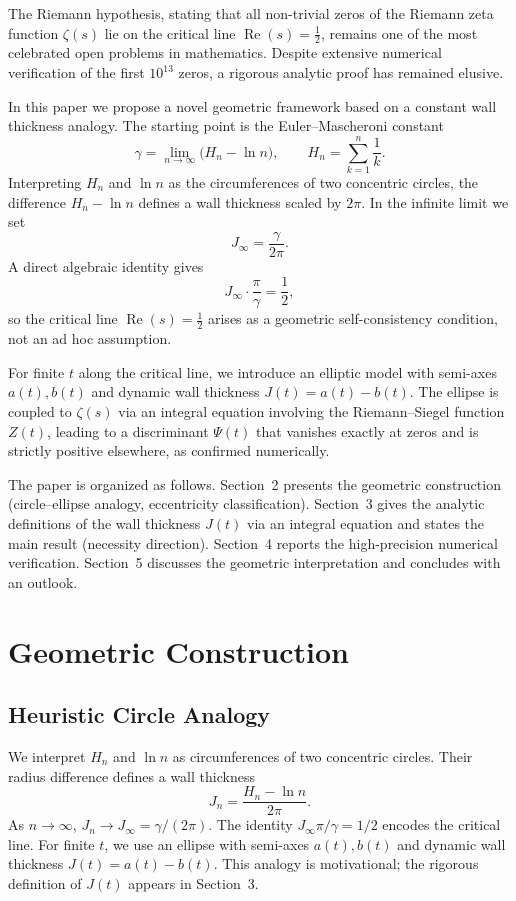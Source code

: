 \documentclass[12pt,a4paper]{article}
\begin{document}
The Riemann hypothesis, stating that all non-trivial zeros of the Riemann zeta function \(\zeta(s)\) lie on the critical line \(\operatorname{Re}(s)=\frac12\), remains one of the most celebrated open problems in mathematics. Despite extensive numerical verification of the first \(10^{13}\) zeros, a rigorous analytic proof has remained elusive.

In this paper we propose a novel geometric framework based on a constant wall thickness analogy. The starting point is the Euler--Mascheroni constant
\[
\gamma = \lim_{n\to\infty}\bigl(H_n - \ln n\bigr),\qquad H_n = \sum_{k=1}^{n}\frac1k.
\]
Interpreting \(H_n\) and \(\ln n\) as the circumferences of two concentric circles, the difference \(H_n-\ln n\) defines a wall thickness scaled by \(2\pi\). In the infinite limit we set
\[
J_{\infty} = \frac{\gamma}{2\pi}.
\]
A direct algebraic identity gives
\[
J_{\infty}\cdot\frac{\pi}{\gamma} = \frac12,
\]
so the critical line \(\operatorname{Re}(s)=\frac12\) arises as a geometric self-consistency condition, not an ad hoc assumption.

For finite \(t\) along the critical line, we introduce an elliptic model with semi-axes \(a(t),b(t)\) and dynamic wall thickness \(J(t)=a(t)-b(t)\). The ellipse is coupled to \(\zeta(s)\) via an integral equation involving the Riemann--Siegel function \(Z(t)\), leading to a discriminant \(\Psi(t)\) that vanishes exactly at zeros and is strictly positive elsewhere, as confirmed numerically.

The paper is organized as follows. Section~2 presents the geometric construction (circle--ellipse analogy, eccentricity classification). Section~3 gives the analytic definitions of the wall thickness \(J(t)\) via an integral equation and states the main result (necessity direction). Section~4 reports the high-precision numerical verification. Section~5 discusses the geometric interpretation and concludes with an outlook.

\section{Geometric Construction}

\subsection{Heuristic Circle Analogy}
We interpret \(H_n\) and \(\ln n\) as circumferences of two concentric circles. Their radius difference defines a wall thickness
\[
J_n = \frac{H_n - \ln n}{2\pi}.
\]
As \(n\to\infty\), \(J_n \to J_{\infty} = \gamma/(2\pi)\). The identity \(J_{\infty}\pi/\gamma = 1/2\) encodes the critical line. For finite \(t\), we use an ellipse with semi-axes \(a(t),b(t)\) and dynamic wall thickness \(J(t)=a(t)-b(t)\). This analogy is motivational; the rigorous definition of \(J(t)\) appears in Section~3.
\end{document}
